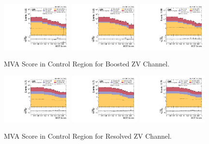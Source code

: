 \begin{figure}[!ht]
  \centering
  \includegraphics[width=0.32\textwidth]{analysis_plots/2016_zv/cr_vjets_l/mva_score_zv_var2_log.pdf}
  \includegraphics[width=0.32\textwidth]{analysis_plots/2017_zv/cr_vjets_l/mva_score_zv_var2_log.pdf}
  \includegraphics[width=0.32\textwidth]{analysis_plots/2018_zv/cr_vjets_l/mva_score_zv_var2_log.pdf} \\
  \caption[MVA Score in Control Region for Boosted ZV Channel]%
  {MVA Score in Control Region for Boosted ZV Channel.}%
  \label{fig:zv-cr-l-mva-score}
\end{figure}

\begin{figure}[!ht]
  \centering
  \includegraphics[width=0.32\textwidth]{analysis_plots/2016_zjj/cr_vjets_l/mva_score_zjj_var2_log.pdf}
  \includegraphics[width=0.32\textwidth]{analysis_plots/2017_zjj/cr_vjets_l/mva_score_zjj_var2_log.pdf}
  \includegraphics[width=0.32\textwidth]{analysis_plots/2018_zjj/cr_vjets_l/mva_score_zjj_var2_log.pdf} \\
  \caption[MVA Score in Control Region for Resolved ZV Channel]%
  {MVA Score in Control Region for Resolved ZV Channel.}%
  \label{fig:zjj-cr-l-mva-score}
\end{figure}

